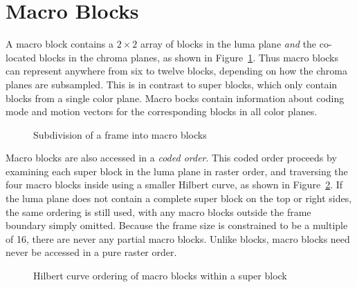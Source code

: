 \documentclass[11pt,letterpaper]{book}
\newcommand{\term}[1]{{\em #1}}
\numberwithin{equation}{chapter}
\numberwithin{figure}{chapter}
\numberwithin{table}{chapter}
\begin{document}
\section{Macro Blocks}
\label{sec:mbs}

A macro block contains a $2\times 2$ array of blocks in the luma plane
 {\em and} the co-located blocks in the chroma planes, as shown in
 Figure~\ref{fig:macroblock}.
Thus macro blocks can represent anywhere from six to twelve blocks, depending
 on how the chroma planes are subsampled.
This is in contrast to super blocks, which only contain blocks from a single
 color plane.
Macro bocks contain information about coding mode and motion vectors for the
 corresponding blocks in all color planes.

\begin{figure}[htb]
 \begin{center}
 
 \end{center}
 \caption{Subdivision of a frame into macro blocks}
 \label{fig:macroblock}
\end{figure}

Macro blocks are also accessed in a \term{coded order}.
This coded order proceeds by examining each super block in the luma plane in
 raster order, and traversing the four macro blocks inside using a smaller
 Hilbert curve, as shown in Figure~\ref{fig:hilbert-mb}.
If the luma plane does not contain a complete super block on the top or right
 sides, the same ordering is still used, with any macro blocks outside
 the frame boundary simply omitted.
Because the frame size is constrained to be a multiple of 16, there are never
 any partial macro blocks.
Unlike blocks, macro blocks need never be accessed in a pure raster order.

\begin{figure}[htb]
\begin{center}

\end{center}
\caption{Hilbert curve ordering of macro blocks within a super block}
\label{fig:hilbert-mb}
\end{figure}
\end{document}
